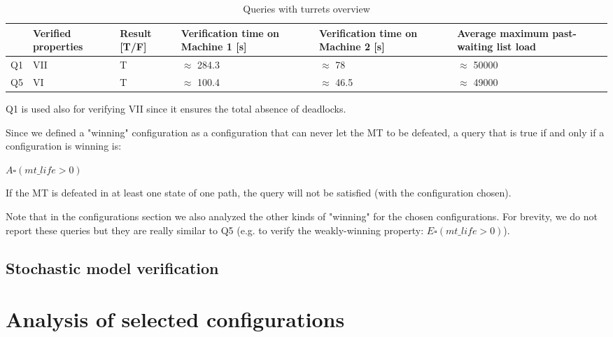 \documentclass[
10pt, %
a4paper, %
oneside, %
headinclude,footinclude, %
BCOR5mm, %
]{scrartcl}
\begin{document}
				\begin{table}[H]
					\centering
					\begin{tabularx}{\textwidth}{||c|>{\raggedright\arraybackslash}X|>{\raggedright\arraybackslash}X|>{\raggedright\arraybackslash}X|>{\raggedright\arraybackslash}X|>{\raggedright\arraybackslash}X||}
						\hline
						& Verified properties & Result [T/F] & Verification time on Machine 1 [s] & Verification time on Machine 2 [s] & Average maximum past-waiting list load \\
						\hline
						Q1 & VII & T & $\approx$ 284.3 & $\approx$ 78 & $\approx$ 50000\\ \hline
						Q5 & VI & T &  $\approx$ 100.4 & $\approx$ 46.5 & $\approx$ 49000  \\
						\hline
					\end{tabularx}
					\caption{Queries with turrets overview}
				\end{table}
				
				Q1 is used also for verifying VII since it ensures the total absence of deadlocks.
				
				Since we defined a "winning" configuration as a configuration that can never let the MT to be defeated, a query that is true if and only if a configuration is winning is:
				\begin{center}
					$A\square(mt\_life>0)$	
				\end{center}
				If the MT is defeated in at least one state of one path, the query will not be satisfied (with the configuration chosen).
				
				Note that in the configurations section we also analyzed the other kinds of "winning" for the chosen configurations. For brevity, we do not report these queries but they are really similar to Q5 (e.g. to verify the weakly-winning property: $E\square(mt\_life>0)$).
		\subsection{Stochastic model verification}
		\newpage
	\section{Analysis of selected configurations}
\end{document}
